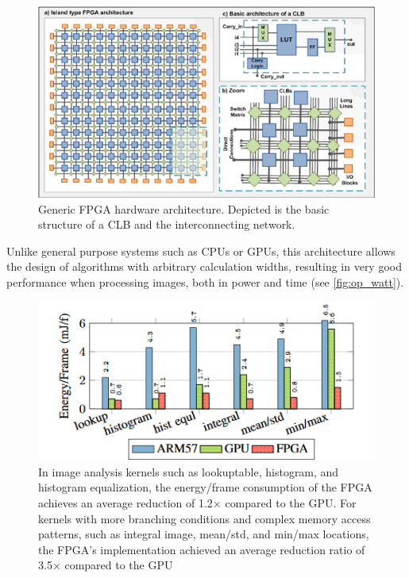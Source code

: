 \begin{figure}[h!]
\centering
\includegraphics[width=\textwidth]{figures/clb.png}
\caption[Generic FPGA hardware architecture]{Generic FPGA hardware architecture. Depicted is the basic structure of a CLB and the interconnecting network.}
  \label{fig:clb}
\end{figure}

\pagebreak

Unlike general purpose systems such as CPUs or GPUs, this architecture allows the design of algorithms with arbitrary calculation widths, resulting in very good performance when processing images, both in power and time (see \autoref{fig:op_watt}).

\begin{figure}[h!]
\centering
\includegraphics[width=\textwidth]{figures/op_watt.png}
\caption[Efficiency comparison between CPU, GPU and FPGA for image processing]{In image analysis kernels  such  as  lookuptable, histogram, and histogram equalization, the energy/frame consumption  of  the  FPGA  achieves  an  average  reduction  of 1.2× compared  to  the  GPU.  For  kernels  with  more branching  conditions  and  complex  memory  access  patterns, such as integral image, mean/std, and min/max locations, the FPGA’s  implementation  achieved  an  average  reduction  ratio of 3.5× compared to the GPU\cite{ochoa-ruiz_high-level_2012}}
  \label{fig:op_watt}
\end{figure}

